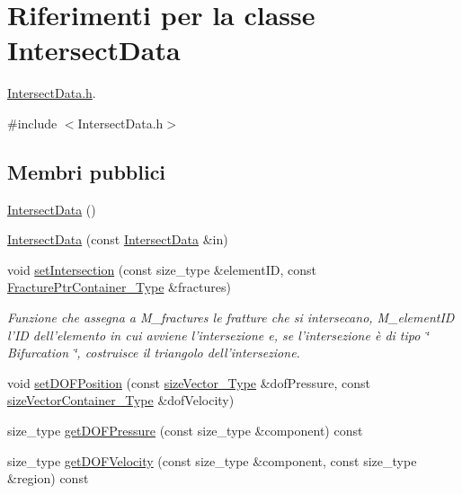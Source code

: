 \hypertarget{classIntersectData}{\section{Riferimenti per la classe Intersect\-Data}
\label{classIntersectData}
}


\hyperlink{IntersectData_8h}{Intersect\-Data.\-h}.  




{\ttfamily \#include $<$Intersect\-Data.\-h$>$}

\subsection*{Membri pubblici}
\begin{DoxyCompactItemize}
\item 
\hyperlink{classIntersectData_ac86ac869672ccd193327ce246e7969d6}{Intersect\-Data} ()
\item 
\hyperlink{classIntersectData_a731a27ad828cdc8146679a292cbd4582}{Intersect\-Data} (const \hyperlink{classIntersectData}{Intersect\-Data} \&in)
\item 
void \hyperlink{classIntersectData_a306be572e6e9a2359310ba908e693b2e}{set\-Intersection} (const size\-\_\-type \&element\-I\-D, const \hyperlink{FractureHandler_8h_a2f0b57e18ecf89912d7de0c87158009e}{Fracture\-Ptr\-Container\-\_\-\-Type} \&fractures)
\begin{DoxyCompactList}\small\item\em Funzione che assegna a M\-\_\-fractures le fratture che si intersecano, M\-\_\-element\-I\-D l'I\-D dell'elemento in cui avviene l'intersezione e, se l'intersezione è di tipo \char`\"{} Bifurcation \char`\"{}, costruisce il triangolo dell'intersezione. \end{DoxyCompactList}\item 
void \hyperlink{classIntersectData_ac4e5826b88471e0f1514cae82c49bcae}{set\-D\-O\-F\-Position} (const \hyperlink{Core_8h_a83c51913d041a5001e8683434c09857f}{size\-Vector\-\_\-\-Type} \&dof\-Pressure, const \hyperlink{Core_8h_a80e8381d86ecb0a7f4f87ff84d1a0be5}{size\-Vector\-Container\-\_\-\-Type} \&dof\-Velocity)
\item 
size\-\_\-type \hyperlink{classIntersectData_a50b33fda9608ffc678057b08e7aed405}{get\-D\-O\-F\-Pressure} (const size\-\_\-type \&component) const 
\item 
size\-\_\-type \hyperlink{classIntersectData_a8a5946e35f80576da495a107464cd2cb}{get\-D\-O\-F\-Velocity} (const size\-\_\-type \&component, const size\-\_\-type \&region) const 

\end{DoxyCompactItemize}
